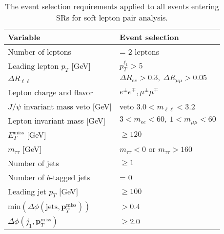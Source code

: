 \documentclass[preprint, superscriptaddress,amsmath, nofootinbib]{revtex4-1}
\begin{document}
\begin{table}[ht!] \begin{center}
 
 \begin{tabular}{l|p{8cm}} \toprule[1pt]
 
  Variable                                                                       & Event selection           \\ \hline
  Number of leptons                                                              & = 2 leptons   \\
  Leading lepton $p_T$ [GeV]                                              & $p^{\ell_1}_T > 5$       \\
  $\Delta R_{\ell \ell}$                                 &$\Delta R_{ee} > 0.3, \ \Delta R_{\mu \mu} > 0.05$      \\
  Lepton charge and flavor                                                       & $e^{\pm}e^{\mp}, \mu^{\pm}\mu^{\mp}$     \\
   $J/\psi$ invariant mass veto [GeV]                                                  & veto $3.0 < m_{\ell \ell} < 3.2$      \\
   Lepton invariant mass [GeV]                                       & $3 < m_{ee} < 60, \ 1 < m_{\mu\mu} < 60$    \\
  $E_T^\mathrm{miss}$ [GeV]       & $\geq 120$ \\
  $m_{\tau\tau}$ [GeV]                   & $m_{\tau\tau} < 0$ or $m_{\tau\tau} > 160$    \\
  Number of jets                  & $\geq 1$  \\
  Number of $b$-tagged jets                                                    & = 0     \\
  Leading jet $p_T$ [GeV]         &   $\geq 100$   \\
  min$(\Delta\phi(\mathrm{jets}, \mathbf{p}_T^\mathrm{miss}))$                          &$ > 0.4$     \\
  $\Delta\phi(j_{1}, \mathbf{p}_T^\mathrm{miss})$        & $\geq 2.0$   \\   

  
  
  \bottomrule[1pt]
 \end{tabular}\end{center}
 \caption{The event selection requirements applied to all events entering SRs for soft lepton pair analysis.}
 \label{table.1}
\end{table}
\end{document}
